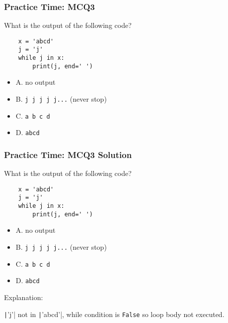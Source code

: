 \documentclass{beamer}
\begin{document}
\begin{frame}[fragile]
    \frametitle{Practice Time: MCQ3}
    What is the output of the following code?
    \begin{verbatim}
    x = 'abcd'
    j = 'j'
    while j in x:
        print(j, end=' ')
    \end{verbatim}
    \begin{itemize}
        \item A. no output
        \item B. \texttt{j j j j j...} (never stop)
        \item C. \texttt{a b c d}
        \item D. \texttt{abcd}
    \end{itemize}
\end{frame}
\begin{frame}[fragile]
    \frametitle{Practice Time: MCQ3 Solution}
    What is the output of the following code?
    \begin{verbatim}
    x = 'abcd'
    j = 'j'
    while j in x:
        print(j, end=' ')
    \end{verbatim}
    \begin{itemize}
        \item \alert{A. no output}
        \item B. \texttt{j j j j j...} (never stop)
        \item C. \texttt{a b c d}
        \item D. \texttt{abcd}
    \end{itemize}

    Explanation:

    \texttt|'j'| not in \texttt|'abcd'|,
    while condition is \texttt{False} so loop body not executed.
\end{frame}
\end{document}
